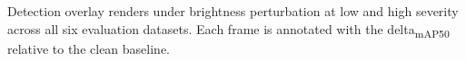 \caption{Detection overlay renders under brightness perturbation at low and high severity across all six evaluation datasets. Each frame is annotated with the delta\textsubscript{mAP50} relative to the clean baseline.}\label{fig:perturbation-plate-brightness}
